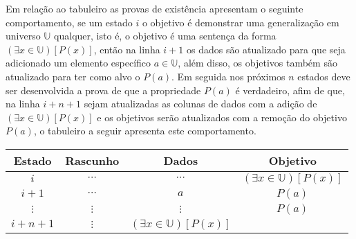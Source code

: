 Em relação ao tabuleiro as provas de existência apresentam o seguinte comportamento, se um estado $i$ o objetivo é demonstrar uma generalização em universo $\mathbb{U}$ qualquer, isto é, o objetivo é uma sentença da forma $(\exists x \in \mathbb{U})[P(x)]$, então na linha $i+1$ os dados são atualizado para que seja adicionado um elemento específico $a \in \mathbb{U}$, além disso, os objetivos também são atualizado para ter como alvo o $P(a)$. Em seguida nos próximos $n$ estados deve ser desenvolvida a prova de que a propriedade $P(a)$ é verdadeiro, afim de que, na linha $i+n+1$ sejam atualizadas as colunas de dados com a adição de $(\exists x \in \mathbb{U})[P(x)]$ e os objetivos serão atualizados com a remoção do objetivo $P(a)$, o tabuleiro a seguir apresenta este comportamento.

\begin{table*}[h]
	\centering
	\begin{tabular}{c|c|c|c}
		\hline
		\rowcolor{cinzaClaro}
		Estado & Rascunho & Dados & Objetivo\\
		\hline
		$i$ & $\cdots$ & $\cdots$ & $(\exists x \in \mathbb{U})[P(x)]$\\
		$i+1$ & $\cdots$ & $a$ & $P(a)$\\
		$\vdots$ & $\vdots$ & $\vdots$ & $P(a)$\\
		$i+n+1$ & $\vdots$ & $(\exists x \in \mathbb{U})[P(x)]$ & \\
		\hline 
	\end{tabular}
\end{table*}

